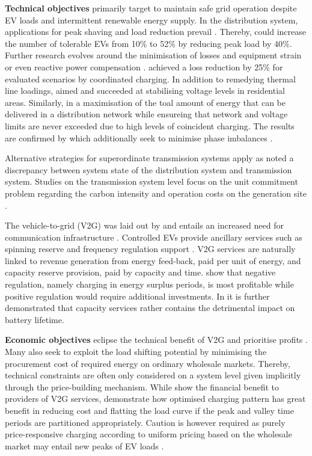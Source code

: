 \textbf{Technical objectives} primarily target to maintain safe grid operation despite EV loads and intermittent renewable energy supply. In the distribution system, applications for peak shaving and load reduction prevail \cite{Mets2010, Turker2013, Wang2013a}. Thereby, \cite{Lopes2010, Mets2010} could increase the number of tolerable EVs from 10\% to 52\% by reducing peak load by 40\%. Further research evolves around the minimisation of losses and equipment strain \cite{Deilami2011, Sortomme2011} or even reactive power compensation \cite{Tan2016a}. \cite{Acha2012} achieved a loss reduction by 25\% for evaluated scenarios by coordinated charging. In addition to remedying thermal line loadings, \cite{Sundstrom2012, Connell2012} aimed and succeeded at stabilising voltage levels in residential areas. Similarly, in \cite{Richardson2012,Richardson2012a} a maximisation of the toal amount of energy that can be delivered in a distribution network while ensureing that network and voltage limits are never exceeded due to high levels of coincident charging. The results are confirmed by \cite{Richardson2010, Huang2012} which additionally seek to minimise phase imbalances \cite{Richardson2012}.

Alternative strategies for superordinate transmission systems apply as \cite{Vaya2012, Salah2012} noted a discrepancy between system state of the distribution system and transmission system. Studies on the transmission system level focus on the unit commitment problem regarding the carbon intensity and operation costs on the generation site \cite{Kiviluoma2011, Sioshansi2009}. 

The vehicle-to-grid (V2G) was laid out by \cite{Kempton1997} and entails an increased need for communication infrastructure \cite{Quinn2009}. Controlled EVs provide ancillary services such as spinning reserve and frequency regulation support \cite{Lopes2010, Tomic2007, Andersson2010}. V2G services are naturally linked to revenue generation from energy feed-back, paid per unit of energy, and capacity reserve provision, paid by capacity and time\cite{Kempton2005a}. \cite{Dallinger2011, Sortomme2011} show that negative regulation, namely charging in energy surplus periods, is most profitable while positive regulation would require additional investments. In \cite{Peterson2010} it is further demonstrated that capacity services rather contains the detrimental impact on battery lifetime.

\textbf{Economic objectives} eclipse the technical benefit of V2G and prioritise profits \cite{Sortomme2012}. Many also seek to exploit the load shifting potential by minimising the procurement cost of required energy on ordinary wholesale markets. Thereby, technical constraints are often only considered on a system level given implicitly through the price-building mechanism. While \cite{Guo2016} show the financial benefit to providers of V2G services, \cite{Cao2012} demonstrate how optimised charging pattern has great benefit in reducing cost and flatting the load curve if the peak and valley time periods are partitioned appropriately. Caution is however required as purely price-responsive charging according to uniform pricing based on the wholesale market may entail new peaks of EV loads \cite{Flath2013}.


